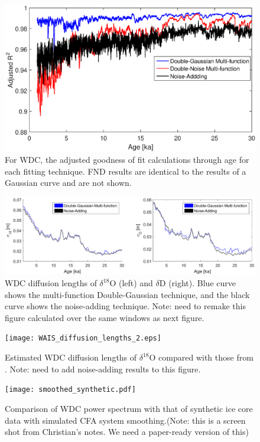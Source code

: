 \documentclass[draft, jgrga]{AGUTeX}
\begin{document}
\begin{figure}
	\includegraphics[width=.9\linewidth]{G_of_fit_1.eps}
	\caption{For WDC, the adjusted goodness of fit calculations through age for each fitting technique. FND results are identical to the results of a Gaussian curve and are not shown.} \label{G_of_fit_1}
\end{figure}

\begin{figure}
	\includegraphics[width=\linewidth]{WAIS_diffusion_adding_noise.eps}
	\caption{WDC diffusion lengths of $\delta^{18}$O (left) and $\delta$D (right). Blue curve shows the multi-function Double-Gaussian technique, and the black curve shows the noise-adding technique. Note: need to remake this figure calculated over the same windows as next figure.} \label{WAIS_diffusion_adding_noise}
\end{figure}

\begin{figure}
	\texttt{[image: WAIS\_diffusion\_lengths\_2.eps]}
	\caption{Estimated WDC diffusion lengths of $\delta^{18}$O compared with those from \cite{Jones2017a}. Note: need to add noise-adding results to this figure.} \label{WAIS_diffusion_lengths}
\end{figure}

\begin{figure}
	\texttt{[image: smoothed\_synthetic.pdf]}
	\caption{Comparison of WDC power spectrum with that of synthetic ice core data with simulated CFA system smoothing.(Note: this is a screen shot from Christian's notes. We need a paper-ready version of this)} \label{smoothed_synthetic}
\end{figure}
\end{document}
